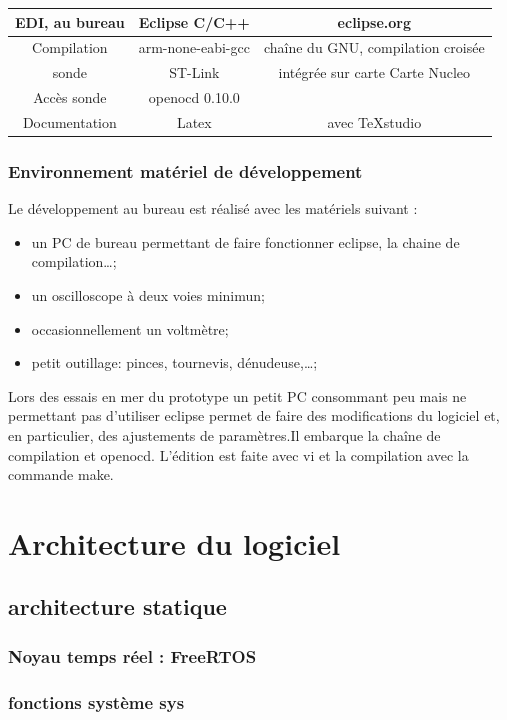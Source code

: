 \documentclass[a4paper,11pt]{report}
\begin{document}
\begin{tabular}{|c|c|c|}
	\hline 
	EDI, au bureau & Eclipse C/C++ & eclipse.org    \\ 
	\hline 
	Compilation & arm-none-eabi-gcc & chaîne du GNU, compilation croisée \\ 
	\hline 
	sonde & ST-Link & intégrée sur carte Carte Nucleo   \\ 
	\hline 
	Accès sonde & openocd 0.10.0 &   \\ 
	\hline 
	Documentation & Latex &  avec TeXstudio\\
	\hline 
\end{tabular}

\subsection{Environnement matériel de développement}
Le développement au bureau est réalisé avec les matériels suivant :
\begin{itemize}
	\item un PC de bureau permettant de faire fonctionner eclipse, la chaine de compilation\dots;
	\item un oscilloscope à deux voies minimun;
	\item occasionnellement un voltmètre;
	\item petit outillage: pinces, tournevis, dénudeuse,\ldots;
\end{itemize}
Lors des essais en mer du prototype un petit PC consommant peu
mais ne permettant pas d'utiliser eclipse permet de faire des
modifications du logiciel et, en particulier, des ajustements
de paramètres.Il embarque la chaîne de compilation et openocd.
L'édition est faite avec vi et la compilation avec la commande make.


\chapter{Architecture du logiciel}
\section{architecture statique}
\subsection{Noyau temps réel : FreeRTOS}
\subsection{fonctions système sys}
\end{document}
